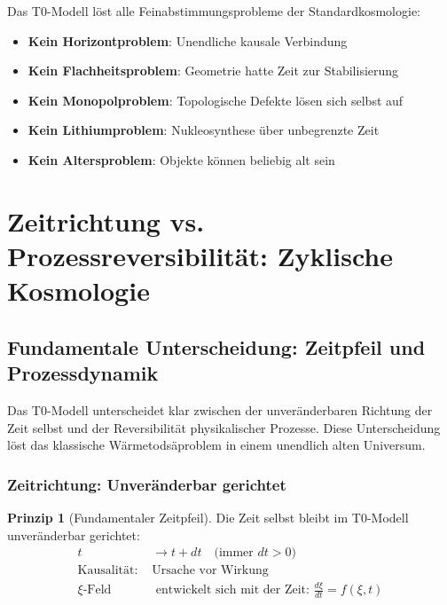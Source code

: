 \documentclass[12pt,a4paper]{article}
\theoremstyle{definition}
\newtheorem{principle}{Prinzip}
\begin{document}
	\begin{important}
		Das T0-Modell löst alle Feinabstimmungsprobleme der Standardkosmologie:
		\begin{itemize}
			\item \textbf{Kein Horizontproblem}: Unendliche kausale Verbindung
			\item \textbf{Kein Flachheitsproblem}: Geometrie hatte Zeit zur Stabilisierung  
			\item \textbf{Kein Monopolproblem}: Topologische Defekte lösen sich selbst auf
			\item \textbf{Kein Lithiumproblem}: Nukleosynthese über unbegrenzte Zeit
			\item \textbf{Kein Altersproblem}: Objekte können beliebig alt sein
		\end{itemize}
	\end{important}
	
	\section{Zeitrichtung vs. Prozessreversibilität: Zyklische Kosmologie}
	
	\subsection{Fundamentale Unterscheidung: Zeitpfeil und Prozessdynamik}
	
	\begin{important}
		Das T0-Modell unterscheidet klar zwischen der unveränderbaren Richtung der Zeit selbst und der Reversibilität physikalischer Prozesse. Diese Unterscheidung löst das klassische Wärmetodsäproblem in einem unendlich alten Universum.
	\end{important}
	
	\subsubsection{Zeitrichtung: Unveränderbar gerichtet}
	
	\begin{principle}[Fundamentaler Zeitpfeil]
		Die Zeit selbst bleibt im T0-Modell unveränderbar gerichtet:
		\begin{align}
			t &\rightarrow t + dt \quad \text{(immer } dt > 0\text{)} \\
			\text{Kausalität: } &\text{Ursache vor Wirkung} \\
			\xi\text{-Feld} &\text{ entwickelt sich mit der Zeit: } \frac{d\xi}{dt} = f(\xi, t)
		\end{align}
	\end{principle}
	
\end{document}
